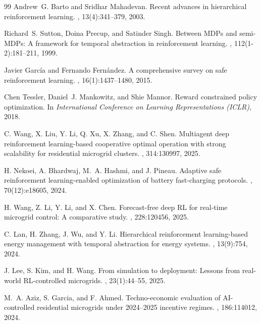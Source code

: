 \documentclass[11pt,a4paper]{article}
\begin{document}
\begin{thebibliography}{99}
Andrew~G. Barto and Sridhar Mahadevan.
\newblock Recent advances in hierarchical reinforcement learning.
, 13(4):341--379, 2003.

Richard~S. Sutton, Doina Precup, and Satinder Singh.
\newblock Between MDPs and semi-MDPs: A framework for temporal abstraction in reinforcement learning.
, 112(1-2):181--211, 1999.

Javier Garc\'{i}a and Fernando Fern\'{a}ndez.
\newblock A comprehensive survey on safe reinforcement learning.
, 16(1):1437--1480, 2015.

Chen Tessler, Daniel~J. Mankowitz, and Shie Mannor.
\newblock Reward constrained policy optimization.
\newblock In {\em International Conference on Learning Representations (ICLR)}, 2018.

C. Wang, X. Liu, Y. Li, Q. Xu, X. Zhang, and C. Shen.
\newblock Multiagent deep reinforcement learning-based cooperative optimal operation with strong scalability for residential microgrid clusters.
, 314:130997, 2025.

H. Nekoei, A. Bhardwaj, M.~A. Hashmi, and J. Pineau.
\newblock Adaptive safe reinforcement learning-enabled optimization of battery fast-charging protocols.
, 70(12):e18605, 2024.

H. Wang, Z. Li, Y. Li, and X. Chen.
\newblock Forecast-free deep RL for real-time microgrid control: A comparative study.
, 228:120456, 2025.

C. Lan, H. Zhang, J. Wu, and Y. Li.
\newblock Hierarchical reinforcement learning-based energy management with temporal abstraction for energy systems.
, 13(9):754, 2024.

J. Lee, S. Kim, and H. Wang.
\newblock From simulation to deployment: Lessons from real-world RL-controlled microgrids.
, 23(1):44--55, 2025.

M.~A. Aziz, S. Garcia, and F. Ahmed.
\newblock Techno-economic evaluation of AI-controlled residential microgrids under 2024--2025 incentive regimes.
, 186:114012, 2024.

\end{thebibliography}
\end{document}
